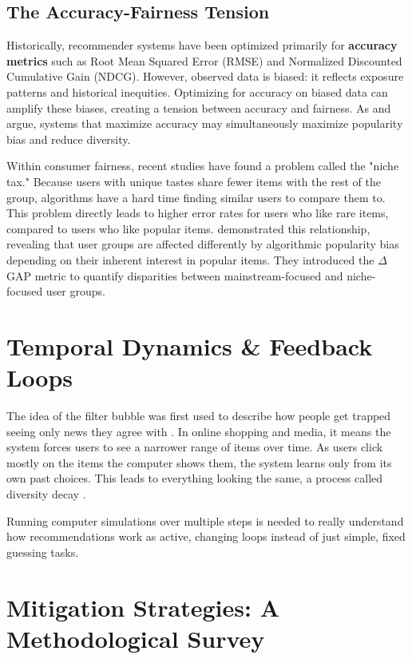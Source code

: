 \documentclass[11pt,a4paper]{report}
\begin{document}
\subsection{The Accuracy-Fairness Tension}
Historically, recommender systems have been optimized primarily for \textbf{accuracy metrics} such as Root Mean Squared Error (RMSE) and Normalized Discounted Cumulative Gain (NDCG). However, observed data is biased: it reflects exposure patterns and historical inequities. Optimizing for accuracy on biased data can amplify these biases, creating a tension between accuracy and fairness. As \citet{ekstrand2022fairness} and \citet{abdollahpouri2019managing} argue, systems that maximize accuracy may simultaneously maximize popularity bias and reduce diversity.

Within consumer fairness, recent studies have found a problem called the "niche tax." Because users with unique tastes share fewer items with the rest of the group, algorithms have a hard time finding similar users to compare them to. This problem directly leads to higher error rates for users who like rare items, compared to users who like popular items. \citet{abdollahpouri2020multistakeholder} demonstrated this relationship, revealing that user groups are affected differently by algorithmic popularity bias depending on their inherent interest in popular items. They introduced the $\Delta$GAP metric to quantify disparities between mainstream-focused and niche-focused user groups.

\section{Temporal Dynamics \& Feedback Loops}
The idea of the filter bubble was first used to describe how people get trapped seeing only news they agree with \citep{chaney2018algorithmic}. In online shopping and media, it means the system forces users to see a narrower range of items over time. As users click mostly on the items the computer shows them, the system learns only from its own past choices. This leads to everything looking the same, a process called diversity decay \citep{mansoury2020feedback}.

Running computer simulations over multiple steps is needed to really understand how recommendations work as active, changing loops instead of just simple, fixed guessing tasks.

\section{Mitigation Strategies: A Methodological Survey}
\end{document}
